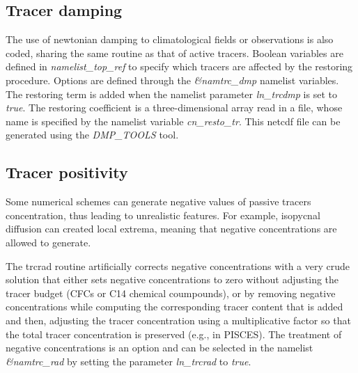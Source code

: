 \documentclass[../main/TOP_manual]{subfiles}
\begin{document}

\subsection{Tracer damping}

The use of newtonian damping  to climatological fields or observations is also coded, sharing the same routine as that of active tracers.
Boolean variables are defined in \textit{namelist\_top\_ref} to specify which tracers are affected by the restoring procedure.
Options are defined through the \textit{\&namtrc\_dmp} namelist variables.
The restoring term is added when the namelist parameter \textit{ln\_trcdmp} is set to \textit{true}.
The restoring coefficient is a three-dimensional array read in a file, whose name is specified by the namelist variable \textit{cn\_resto\_tr}.
This netcdf file can be generated using the \textit{DMP\_TOOLS} tool.


\subsection{Tracer positivity}

Some numerical schemes can generate negative values of passive tracers concentration, thus leading to unrealistic features.
For example, isopycnal diffusion can created local extrema, meaning that negative concentrations are allowed to generate.

The trcrad routine artificially corrects negative concentrations with a very crude solution that either sets negative concentrations to zero without adjusting the tracer budget (CFCs or C14 chemical coumpounds), or by removing negative concentrations while computing the corresponding tracer content that is added and then, adjusting the tracer concentration using a multiplicative factor so that the total tracer concentration is preserved (e.g., in PISCES).
The treatment of negative concentrations is an option and can be selected in the namelist \textit{\&namtrc\_rad} by setting the parameter \textit{ln\_trcrad} to \textit{true}.
\end{document}
